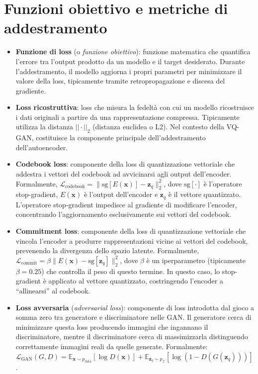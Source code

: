 \section{Funzioni obiettivo e metriche di addestramento}
\label{sec:def-loss}
\begin{itemize}
	\item \textbf{Funzione di loss} (o \emph{funzione obiettivo}): funzione matematica che quantifica l'errore tra l'output prodotto da un modello e il target desiderato. Durante l'addestramento, il modello aggiorna i propri parametri per minimizzare il valore della loss, tipicamente tramite retropropagazione e discesa del gradiente.
	\item \textbf{Loss ricostruttiva}: loss che misura la fedeltà con cui un modello ricostruisce i dati originali a partire da una rappresentazione compressa. Tipicamente utilizza la distanza $||\cdot||_2$ (distanza euclidea o L2). Nel contesto della VQ-GAN, costituisce la componente principale dell'addestramento dell'autoencoder.
	\item \textbf{Codebook loss}: componente della loss di quantizzazione vettoriale che addestra i vettori del codebook ad avvicinarsi agli output dell'encoder. Formalmente, $\mathcal{L}_{\text{codebook}} = \|\mathrm{sg}[E(\mathbf{x})] - \mathbf{z}_q\|_2^2$, dove $\mathrm{sg}[\cdot]$ è l'operatore stop-gradient, $E(\mathbf{x})$ è l'output dell'encoder e $\mathbf{z}_q$ è il vettore quantizzato. L'operatore stop-gradient impedisce al gradiente di modificare l'encoder, concentrando l'aggiornamento esclusivamente sui vettori del codebook.
	\item \textbf{Commitment loss}: componente della loss di quantizzazione vettoriale che vincola l'encoder a produrre rappresentazioni vicine ai vettori del codebook, prevenendo la divergenza dello spazio latente. Formalmente, $\mathcal{L}_{\text{commit}} = \beta \|E(\mathbf{x}) - \mathrm{sg}[\mathbf{z}_q]\|_2^2$, dove $\beta$ è un iperparametro (tipicamente $\beta=0.25$) che controlla il peso di questo termine. In questo caso, lo stop-gradient è applicato al vettore quantizzato, costringendo l'encoder a ``allinearsi'' al codebook.
	\item \textbf{Loss avversaria} (\emph{adversarial loss}): componente di loss introdotta dal gioco a somma zero tra generatore e discriminatore nelle GAN. Il generatore cerca di minimizzare questa loss producendo immagini che ingannano il discriminatore, mentre il discriminatore cerca di massimizzarla distinguendo correttamente immagini reali da quelle generate. Formalmente: $\mathcal{L}_{\text{GAN}}(G, D) = \mathbb{E}_{\mathbf{x} \sim p_{\text{data}}}[\log D(\mathbf{x})] + \mathbb{E}_{\mathbf{z}_q \sim p_{\mathcal{Z}}}[\log(1 - D(G(\mathbf{z}_q)))]$.

\end{itemize}
